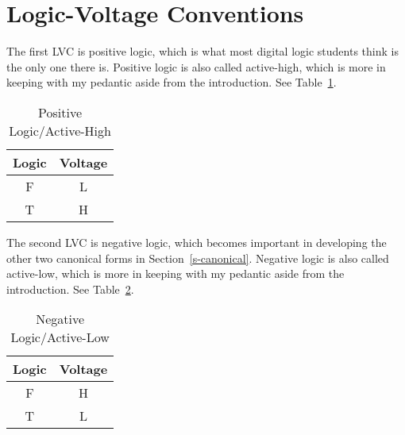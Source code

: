 \section{Logic-Voltage Conventions}

The first LVC is positive logic, which is what most digital logic students think is the only one there is.  Positive logic is also called active-high, which is more in keeping with my pedantic aside from the introduction.  See Table~\ref{tab:positive_logic}.

\begin{table}\begin{center}
\caption{Positive Logic/Active-High}\label{tab:positive_logic}
\begin{tabular}{cc}
Logic & Voltage \\\hline
F     & L \\
T     & H \\
\end{tabular}
\end{center}\end{table}

The second LVC is negative logic, which becomes important in developing the other two canonical forms in Section~\ref{s-canonical}.  Negative logic is also called active-low, which is more in keeping with my pedantic aside from the introduction.  See Table~\ref{tab:negative_logic}.

\begin{table}\begin{center}
\caption{Negative Logic/Active-Low}\label{tab:negative_logic}
\begin{tabular}{cc}
Logic & Voltage \\\hline
F     & H \\
T     & L \\
\end{tabular}
\end{center}\end{table}

